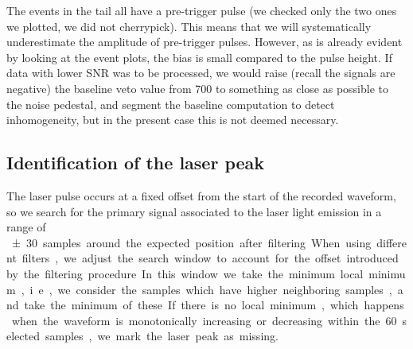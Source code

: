 The events in the tail all have a pre-trigger pulse (we checked only the two
ones we plotted, we did not cherrypick). This means that we will systematically
underestimate the amplitude of pre-trigger pulses. However, as is already
evident by looking at the event plots, the bias is small compared to the pulse
height. If data with lower SNR was to be processed, we would raise (recall the
signals are negative) the baseline veto value from 700 to something as close as
possible to the noise pedestal, and segment the baseline computation to detect
inhomogeneity, but in the present case this is not deemed necessary.

\subsection{Identification of the laser peak}
\label{sec:laser}

The laser pulse occurs at a fixed offset from the start of the recorded
waveform, so we search for the primary signal associated to the laser light
emission in a range of \SI{\pm 30} samples around the expected position after
filtering. When using different filters, we adjust the search window to account
for the offset introduced by the filtering procedure. In this window we take
the minimum local minimum, i.e., we consider the samples which have higher
neighboring samples, and take the minimum of these. If there is no local
minimum, which happens when the waveform is monotonically increasing or
decreasing within the 60 selected samples, we mark the laser peak as missing.

\begin{figure}


    
\end{figure}


